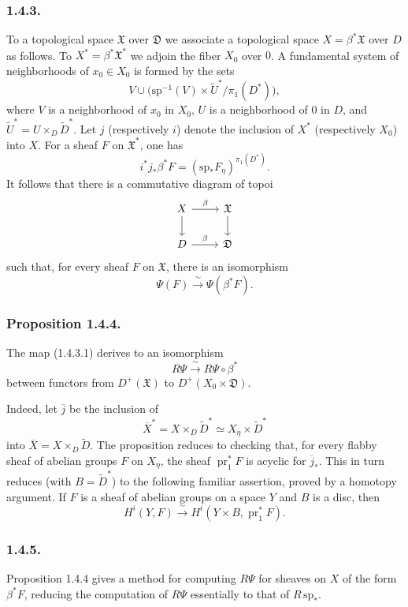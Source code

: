 \subsubsection*{1.4.3.}
To a topological space $\mathfrak X$ over $\mathfrak D$ we associate a
topological space $X=\beta^*\mathfrak X$ over $D$ as follows.  To
$X^*=\beta^*\mathfrak X^*$ we adjoin the fiber $X_0$ over $0$.  A
fundamental system of neighborhoods of $x_0\in X_0$ is formed by the
sets
\[
V\cup
\bigl(\mathrm{sp}^{-1}(V)\times\widetilde U^*/\pi_1(D^*)\bigr),
\]
where $V$ is a neighborhood of $x_0$ in $X_0$, $U$ is a neighborhood
of $0$ in $D$, and
$\widetilde U^*=U\times_D\widetilde D^*$.  Let $j$ (respectively $i$)
denote the inclusion of $X^*$ (respectively $X_0$) into $X$.  For a
sheaf $F$ on $\mathfrak X^*$, one has
\[
i^*j_*\beta^*F
=(\mathrm{sp}_*F_\eta)^{\pi_1(D^*)}.
\]
It follows that there is a commutative diagram of topoi
\[
\begin{tikzcd}
X \arrow[r, "\beta"] \arrow[d]
  & \mathfrak X \arrow[d] \\
D \arrow[r, "\beta"]
  & \mathfrak D
\end{tikzcd}
\]
such that, for every sheaf $F$ on $\mathfrak X$, there is an
isomorphism
\begin{equation}\tag{1.4.3.1}
\Psi(F)\xrightarrow{\ \sim\ }\Psi(\beta^*F).
\end{equation}

\subsubsection*{Proposition 1.4.4.}
The map (1.4.3.1) derives to an isomorphism
\[
R\Psi\xrightarrow{\ \sim\ }R\Psi\circ\beta^*
\]
between functors from $D^+(\mathfrak X)$ to
$D^+(X_0\times\mathfrak D)$.

Indeed, let $\overline j$ be the inclusion of
\[
\overline X^*=X\times_D\widetilde D^*
\simeq X_\eta\times\widetilde D^*
\]
into $\overline X=X\times_D\widetilde D$.  The proposition reduces to
checking that, for every flabby sheaf of abelian groups $F$ on
$X_\eta$, the sheaf $\operatorname{pr}_1^*F$ is acyclic for
$\overline j_*$.  This in turn reduces (with $B=\widetilde D^*$) to
the following familiar assertion, proved by a homotopy argument.  If
$F$ is a sheaf of abelian groups on a space $Y$ and $B$ is a disc,
then
\[
H^i(Y,F)\xrightarrow{\ \sim\ }
H^i(Y\times B,\operatorname{pr}_1^*F).
\]

\subsubsection*{1.4.5.}
Proposition 1.4.4 gives a method for computing $R\Psi$ for sheaves on
$X$ of the form $\beta^*F$, reducing the computation of $R\Psi$
essentially to that of $R\,\mathrm{sp}_*$.

